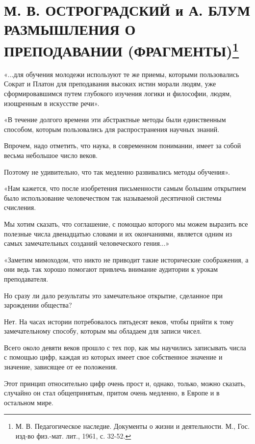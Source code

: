 \documentclass[12pt, a4paper, openany]{book}
\begin{document}
\section[\textls{М. В. Остроградский и А. Блум}. Из предписания директору пензенского дворянского института о способах улучшения преподавания математики. 5 марта 1847 г.]{{\small М. В. ОСТРОГРАДСКИЙ и А. БЛУМ} \\ \textbf{РАЗМЫШЛЕНИЯ О ПРЕПОДАВАНИИ (ФРАГМЕНТЫ){\footnote{ М. В. Педагогическое наследие. Документы о жизни и деятельности. М., Гос. изд-во физ.-мат. лит., 1961, с. 32-52.}}}}


«...для обучения молодежи используют те же приемы,  которыми пользовались Сократ и Платон для преподавания высоких истин морали людям, уже сформировавшимся  путем глубокого изучения логики и философии, людям,  изощренным в искусстве речи». 

«В течение долгого времени эти абстрактные методы были единственным способом, которым пользовались для распространения научных знаний. 

Впрочем, надо отметить, что наука, в современном  понимании, имеет за собой весьма небольшое число веков. 

Поэтому не удивительно, что так медленно развивались методы обучения». 

«Нам кажется, что после изобретения письменности самым большим открытием было использование  человечеством так называемой десятичной системы счисления. 

Мы хотим сказать, что соглашение, с помощью которого мы можем выразить все полезные числа двенадцатью  словами и их окончаниями, является одним из самых  замечательных созданий человеческого гения...» 

«Заметим мимоходом, что никто не приводит такие  исторические соображения, а они ведь так хорошо помогают привлечь внимание аудитории к урокам преподавателя. 

Но сразу ли дало результаты это замечательное  открытие, сделанное при зарождении общества? 

Нет. На часах истории потребовалось пятьдесят веков, чтобы прийти к тому замечательному способу, которым мы обладаем для записи чисел. 

Всего около девяти веков прошло с тех пор, как мы научились записывать числа с помощью цифр, каждая из которых имеет свое собственное значение и значение, зависящее от ее положения. 

Этот принцип относительно цифр очень прост и, однако, только, можно сказать, случайно он стал общепринятым, притом очень медленно, в Европе и в остальном мире. 
\end{document}

